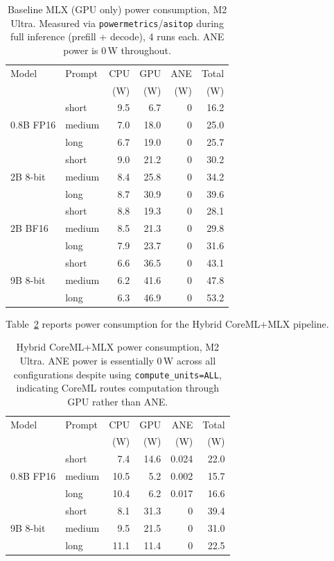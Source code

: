 \documentclass[11pt]{article}
\begin{document}
\begin{table}[h]
\centering
\small
\begin{tabular}{@{}llrrrr@{}}
\toprule
Model & Prompt & CPU & GPU & ANE & Total \\
 & & (W) & (W) & (W) & (W) \\
\midrule
\multirow{3}{*}{0.8B FP16}
  & short  & 9.5  & 6.7  & 0 & 16.2 \\
  & medium & 7.0  & 18.0 & 0 & 25.0 \\
  & long   & 6.7  & 19.0 & 0 & 25.7 \\
\midrule
\multirow{3}{*}{2B 8-bit}
  & short  & 9.0  & 21.2 & 0 & 30.2 \\
  & medium & 8.4  & 25.8 & 0 & 34.2 \\
  & long   & 8.7  & 30.9 & 0 & 39.6 \\
\midrule
\multirow{3}{*}{2B BF16}
  & short  & 8.8  & 19.3 & 0 & 28.1 \\
  & medium & 8.5  & 21.3 & 0 & 29.8 \\
  & long   & 7.9  & 23.7 & 0 & 31.6 \\
\midrule
\multirow{3}{*}{9B 8-bit}
  & short  & 6.6  & 36.5 & 0 & 43.1 \\
  & medium & 6.2  & 41.6 & 0 & 47.8 \\
  & long   & 6.3  & 46.9 & 0 & 53.2 \\
\bottomrule
\end{tabular}
\caption{Baseline MLX (GPU only) power consumption, M2 Ultra.
  Measured via \texttt{powermetrics}/\texttt{asitop} during full
  inference (prefill + decode), 4 runs each. ANE power is 0\,W
  throughout.}
\label{tab:power_baseline}
\end{table}

Table~\ref{tab:power_hybrid} reports power consumption for the Hybrid
CoreML+MLX pipeline.

\begin{table}[h]
\centering
\small
\begin{tabular}{@{}llrrrr@{}}
\toprule
Model & Prompt & CPU & GPU & ANE & Total \\
 & & (W) & (W) & (W) & (W) \\
\midrule
\multirow{3}{*}{0.8B FP16}
  & short  & 7.4  & 14.6 & 0.024 & 22.0 \\
  & medium & 10.5 & 5.2  & 0.002 & 15.7 \\
  & long   & 10.4 & 6.2  & 0.017 & 16.6 \\
\midrule
\multirow{3}{*}{9B 8-bit}
  & short  & 8.1  & 31.3 & 0     & 39.4 \\
  & medium & 9.5  & 21.5 & 0     & 31.0 \\
  & long   & 11.1 & 11.4 & 0     & 22.5 \\
\bottomrule
\end{tabular}
\caption{Hybrid CoreML+MLX power consumption, M2 Ultra.
  ANE power is essentially 0\,W across all configurations despite
  using \texttt{compute\_units=ALL}, indicating CoreML routes
  computation through GPU rather than ANE.}
\label{tab:power_hybrid}
\end{table}
\end{document}
